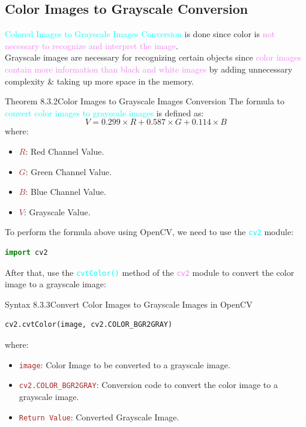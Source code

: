 \documentclass{book}
\begin{document}
\subsection{Color Images to Grayscale Conversion}
\textcolor{cyan}{Colored Images to Grayscale Images Conversion} is done since color is 
\textcolor{violet}{not necessary to recognize and interpret the image}.\\
Grayscale images are necessary for recognizing certain objects since \textcolor{violet}{color images contain more information than black and white images} by adding unnecessary complexity \& taking up more space in the memory.\\
\begin{thmBox}{Theorem 8.3.2}{Color Images to Grayscale Images Conversion}
   The formula to \textcolor{cyan}{convert color images to grayscale images} is defined as:
   \[
        V = 0.299 \times R + 0.587 \times G + 0.114 \times B
   \]
    where:
    \begin{itemize}
        \item \textcolor{brown}{\(R\)}: Red Channel Value.
        \item \textcolor{brown}{\(G\)}: Green Channel Value.
        \item \textcolor{brown}{\(B\)}: Blue Channel Value.
        \item \textcolor{brown}{\(V\)}: Grayscale Value.
    \end{itemize}
\end{thmBox}
To perform the formula above using OpenCV, we need to use the \textcolor{cyan}{\texttt{cv2}} module:\\
\begin{lstlisting}[language=Python, basicstyle=\ttfamily\small, keywordstyle=\color{blue}, commentstyle=\color{forestgreen}, stringstyle=\color{red}, showstringspaces=false]
                                            import cv2
\end{lstlisting}
After that, use the \textcolor{cyan}{\texttt{cvtColor()}} method of the \textcolor{violet}{\texttt{cv2}} module to convert the color image to a grayscale image:
\begin{synBox}{Syntax 8.3.3}{Convert Color Images to Grayscale Images in OpenCV}
    \begin{lstlisting}[language=Python, basicstyle=\ttfamily\small, keywordstyle=\color{blue}, commentstyle=\color{forestgreen}, stringstyle=\color{red}, showstringspaces=false]
                                cv2.cvtColor(image, cv2.COLOR_BGR2GRAY)
    \end{lstlisting}
    where:
    \begin{itemize}
        \item \textcolor{brown}{\texttt{image}}: Color Image to be converted to a grayscale image.
        \item \textcolor{brown}{\texttt{cv2.COLOR\_BGR2GRAY}}: Conversion code to convert the color image to a grayscale image.
        \item \textcolor{brown}{\texttt{Return Value}}: Converted Grayscale Image.
    \end{itemize}
\end{synBox}
\end{document}
